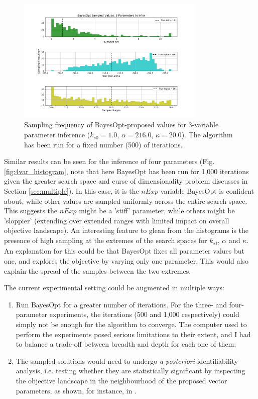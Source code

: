 \documentclass[bsc,frontabs,singlespacing,parskip,deptreport]{infthesis}
\begin{document}
\begin{figure}[ht]
    \centering
    \includegraphics[width=0.8\textwidth]{Images/Multiple variables/Histogram_3var.pdf}
    \caption{Sampling frequency of BayesOpt-proposed values for 3-variable parameter inference ($k_{s0} = 1.0$, $\alpha=216.0$, $\kappa=20.0$). The algorithm has been run for a fixed number (500) of iterations.}
    \label{fig:3var_histogram}
\end{figure}

Similar results can be seen for the inference of four parameters (Fig. \ref{fig:4var_histogram}, note that here BayesOpt has been run for 1,000 iterations given the greater search space and curse of dimensionality problem discusses in Section \ref{sec:multiple}). In this case, it is the $nExp$ variable BayesOpt is confident about, while other values are sampled uniformly across the entire search space. This suggests the $nExp$ might be a 'stiff' parameter, while others might be 'sloppier' (extending over extended ranges with limited impact on overall objective landscape). An interesting feature to glean from the histograms is the presence of high sampling at the extremes of the search spaces for $k_{s)}$, $\alpha$ and $\kappa$. An explanation for this could be that BayesOpt fixes all parameter values but one, and explores the objective by varying only one parameter. This would also explain the spread of the samples between the two extremes.

The current experimental setting could be augmented in multiple ways:

\begin{enumerate}
    \item Run BayesOpt for a greater number of iterations. For the three- and four-parameter experiments, the iterations (500 and 1,000 respectively) could simply not be enough for the algorithm to converge. The computer used to perform the experiments posed serious limitations to their extent, and I had to balance a trade-off between breadth and depth for each one of them;
    
    \item The sampled solutions would need to undergo \textit{a posteriori} identifiability analysis, i.e. testing whether they are statistically significant by inspecting the objective landscape in the neighbourhood of the proposed vector parameters, as shown, for instance, in \cite{pmid18817540}.
\end{enumerate}
\end{document}
